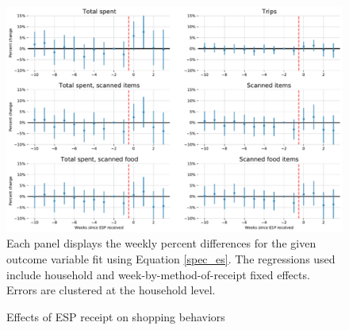\documentclass[12pt]{article}
\begin{document}
\clearpage
\printbibliography


\singlespacing



\clearpage


\clearpage


\clearpage


\clearpage


\clearpage



\clearpage
\begin{figure}[t]
\begin{center}
\caption{Effects of ESP receipt on shopping behaviors}
\label{es_behaviors_all}
\includegraphics[width=1\textwidth, angle=0]{../figures/es_behaviors_all.pdf}
\footnotesize Each panel displays the weekly percent differences for the given outcome variable fit using Equation \ref{spec_es}. The regressions used include household and week-by-method-of-receipt fixed effects. Errors are clustered at the household level. \end{center}
\end{figure}
\end{document}
